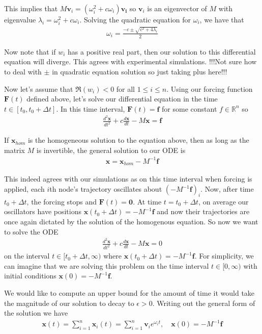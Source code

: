 \documentclass[]{article}
\begin{document}
This implies that $M\mathbf{v}_i = (\omega_i^2 + c\omega_i)\mathbf{v_i}$ so $\mathbf{v}_i$ is an eigenvector of $M$ with eigenvalue $\lambda_i = \omega_i^2 + c\omega_i$. Solving the quadratic equation for $\omega_i$, we have that
\begin{align*}
\omega_i = \frac{-c \pm \sqrt{c^2 + 4\lambda_i}}{2}
\end{align*}

Now note that if $w_i$ has a positive real part, then our solution to this differential equation will diverge. This agrees with experimental simulations. !!!Not sure how to deal with $\pm$ in quadratic equation solution so just taking plus here!!!

Now let's assume that $\Re(w_i) < 0$ for all $1 \leq i \leq n$. Using our forcing function $\mathbf{F}(t)$ defined above, let's solve our differential equation in the time $t \in [t_0, t_0 + \Delta t]$. In this time interval, $\mathbf{F}(t) = \mathbf{f}$ for some constant $f \in \mathbb{R}^n$ so
\begin{align*}
\frac{d^2\mathbf{x}}{dt^2} + c\frac{d\mathbf{x}}{dt} - M\mathbf{x} = \mathbf{f}
\end{align*}

If $\mathbf{x}_{hom}$ is the homogeneous solution to the equation above, then as long as the matrix $M$ is invertible, the general solution to our ODE is
\begin{align*}
\mathbf{x} = \mathbf{x}_{hom} - M^{-1}\mathbf{f}
\end{align*}

This indeed agrees with our simulations as on this time interval when forcing is applied, each $i$th node's trajectory oscillates about $(-M^{-1}\mathbf{f})_i$. Now, after time $t_0 + \Delta t$, the forcing stops and $\mathbf{F}(t) = \mathbf{0}$. At time $t = t_0 + \Delta t$, on average our oscillators have positions $\mathbf{x}(t_0 + \Delta t) = -M^{-1}\mathbf{f}$ and now their trajectories are once again dictated by the solution of the homogenous equation. So now we want to solve the ODE
\begin{align*}
\frac{d^2\mathbf{x}}{dt^2} + c\frac{d\mathbf{x}}{dt} - M\mathbf{x} = 0
\end{align*}
on the interval $t \in [t_0 + \Delta t, \infty)$ where $\mathbf{x}(t_0 + \Delta t) = -M^{-1}\mathbf{f}$. For simplicity, we can imagine that we are solving this problem on the time interval $t \in [0, \infty)$ with initial conditions $\mathbf{x}(0) = -M^{-1}\mathbf{f}$.

We would like to compute an upper bound for the amount of time it would take the magnitude of our solution to decay to $\epsilon > 0$. Writing out the general form of the solution we have
\begin{align*}
\mathbf{x}(t) = \sum_{i=1}^n \mathbf{x}_i(t) = \sum_{i=1}^n \mathbf{v}_ie^{\omega_i t}, \quad \mathbf{x}(0) = -M^{-1}\mathbf{f}
\end{align*}
\end{document}
